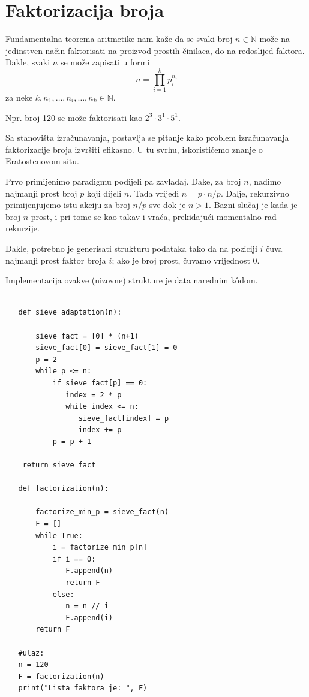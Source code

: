 \section{Faktorizacija broja}

Fundamentalna teorema aritmetike nam kaže da se svaki broj $n \in \mathbb{N}$ može na jedinstven način faktorisati na proizvod prostih činilaca, do na redoslijed faktora. Dakle, svaki $n$ se može zapisati u formi
 $$n = \prod_{i=1}^k p_i^{n_i}$$
 za neke $k, n_1,\ldots, n_i, \ldots, n_k \in \mathbb{N}$.
 
 Npr. broj 120 se može faktorisati kao $2^3 \cdot 3^1 \cdot 5^1$.
 
 Sa stanovišta izračunavanja, postavlja se pitanje kako problem izračunavanja faktorizacije broja izvršiti efikasno.  U tu svrhu, iskoristićemo znanje o Eratostenovom situ. 
 
 Prvo primijenimo paradigmu podijeli pa zavladaj. Dake, za broj $n$, nađimo najmanji prost broj $p$ koji dijeli $n$. Tada vrijedi $n = p \cdot n/p$. Dalje, rekurzivno primijenjujemo istu akciju za broj $n/p$ sve dok je $n>1$. Bazni slučaj je kada je broj $n$ prost, i pri tome se kao takav i vraća, prekidajući momentalno rad rekurzije. 
 
 Dakle, potrebno je generisati strukturu podataka  tako da na poziciji $i$ čuva najmanji prost faktor broja $i$; ako je broj prost, čuvamo vrijednost 0.
 
 Implementacija ovakve (nizovne) strukture je data narednim k\^odom. 
 
 \begin{verbatim}
 
   def sieve_adaptation(n):
   
       sieve_fact = [0] * (n+1)
       sieve_fact[0] = sieve_fact[1] = 0
       p = 2
       while p <= n:
           if sieve_fact[p] == 0:
       		  index = 2 * p
       		  while index <= n:
       			 sieve_fact[index] = p
       			 index += p
           p = p + 1
 	
	return sieve_fact
 	
   def factorization(n):
       
       factorize_min_p = sieve_fact(n)
       F = []
       while True: 
           i = factorize_min_p[n]
           if i == 0: 
              F.append(n)
              return F
           else:
              n = n // i
              F.append(i)
       return F  
   
   #ulaz: 
   n = 120
   F = factorization(n)
   print("Lista faktora je: ", F)
 \end{verbatim} 
 
